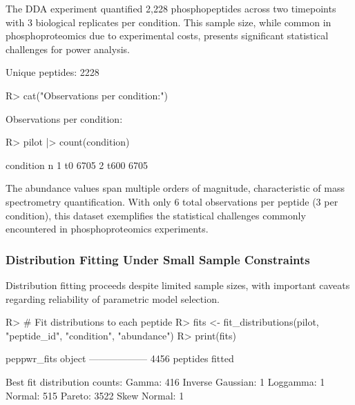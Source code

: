 \documentclass[article]{jss}
\begin{document}
The DDA experiment quantified 2,228 phosphopeptides across two timepoints with 3 biological replicates per condition. This sample size, while common in phosphoproteomics due to experimental costs, presents significant statistical challenges for power analysis.

\begin{Schunk}
\begin{Soutput}
Unique peptides: 2228 
\end{Soutput}
\begin{Sinput}
R> cat("Observations per condition:\n")
\end{Sinput}
\begin{Soutput}
Observations per condition:
\end{Soutput}
\begin{Sinput}
R> pilot |> count(condition)
\end{Sinput}
\begin{Soutput}
  condition    n
1        t0 6705
2      t600 6705
\end{Soutput}
\end{Schunk}

The abundance values span multiple orders of magnitude, characteristic of mass spectrometry quantification. With only 6 total observations per peptide (3 per condition), this dataset exemplifies the statistical challenges commonly encountered in phosphoproteomics experiments.

\subsubsection{Distribution Fitting Under Small Sample Constraints}

Distribution fitting proceeds despite limited sample sizes, with important caveats regarding reliability of parametric model selection.

\begin{Schunk}
\begin{Sinput}
R> # Fit distributions to each peptide
R> fits <- fit_distributions(pilot, "peptide_id", "condition", "abundance")
R> print(fits)
\end{Sinput}
\begin{Soutput}
peppwr_fits object
------------------
4456 peptides fitted

Best fit distribution counts:
  Gamma: 416
  Inverse Gaussian: 1
  Loggamma: 1
  Normal: 515
  Pareto: 3522
  Skew Normal: 1
\end{Soutput}
\end{Schunk}
\end{document}
